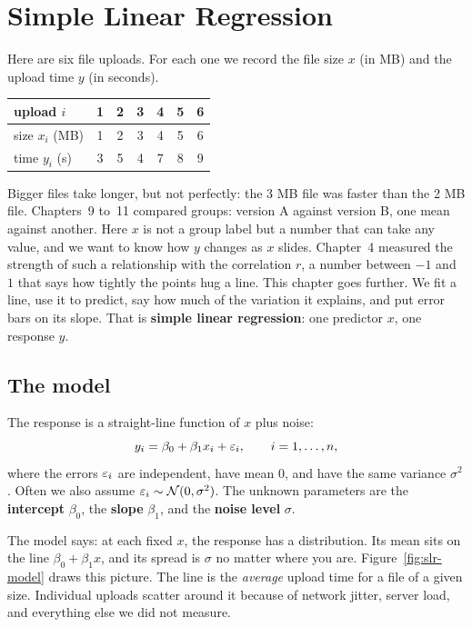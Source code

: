 \chapter{Simple Linear Regression}
\label{ch:simple-linear-regression}

Here are six file uploads. For each one we record the file size $x$ (in MB) and
the upload time $y$ (in seconds).

\begin{center}
\begin{tabular}{lcccccc}
\toprule
upload $i$ & 1 & 2 & 3 & 4 & 5 & 6 \\
\midrule
size $x_i$ (MB) & 1 & 2 & 3 & 4 & 5 & 6 \\
time $y_i$ (s) & 3 & 5 & 4 & 7 & 8 & 9 \\
\bottomrule
\end{tabular}
\end{center}

Bigger files take longer, but not perfectly: the 3 MB file was faster than the
2 MB file. Chapters~9 to~11 compared groups: version A against version B, one
mean against another. Here $x$ is not a group label but a number that can take
any value, and we want to know how $y$ changes as $x$ slides. Chapter~4
measured the strength of such a relationship with the correlation $r$, a
number between $-1$ and $1$ that says how tightly the points hug a line. This
chapter goes further. We fit a line, use it to predict,
say how much of the variation it explains, and put error bars on its slope.
That is \textbf{simple linear regression}: one predictor $x$, one response $y$.

\section{The model}
\label{sec:slr-model}

\begin{definition}
The response is a straight-line function of $x$ plus noise:
\[
  y_i = \beta_0 + \beta_1 x_i + \varepsilon_i, \qquad i = 1,\dots,n,
\]
where the errors $\varepsilon_i$ are independent, have mean $0$, and have the same
variance $\sigma^2$. Often we also assume $\varepsilon_i \sim \mathcal{N}(0,\sigma^2)$.
The unknown parameters are the \textbf{intercept} $\beta_0$, the \textbf{slope}
$\beta_1$, and the \textbf{noise level} $\sigma$.
\end{definition}

The model says: at each fixed $x$, the response has a distribution. Its mean
sits on the line $\beta_0+\beta_1 x$, and its spread is $\sigma$ no matter
where you are. Figure~\ref{fig:slr-model} draws this picture. The line is the
\emph{average} upload time for a file of a given size. Individual uploads
scatter around it because of network jitter, server load, and everything else
we did not measure.

